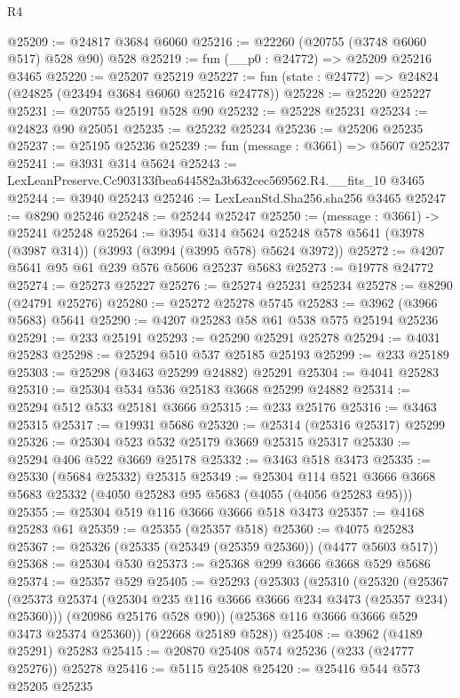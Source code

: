 \begin{lexlean}{R4}
\begin{coremodule}
@25209 := @24817 @3684 @6060
@25216 := @22260 (@20755 (@3748 @6060 @517) @528 @90) @528
@25219 := fun (__p0 : @24772) => @25209 @25216 @3465
@25220 := @25207 @25219
@25227 := fun (state : @24772) => @24824 (@24825 (@23494 @3684 @6060 @25216 @24778))
@25228 := @25220 @25227
@25231 := @20755 @25191 @528 @90
@25232 := @25228 @25231
@25234 := @24823 @90 @25051
@25235 := @25232 @25234
@25236 := @25206 @25235
@25237 := @25195 @25236
@25239 := fun (message : @3661) => @5607 @25237
@25241 := @3931 @314 @5624
@25243 := LexLeanPreserve.Cc903133fbea644582a3b632cec569562.R4.__fits_10 @3465
@25244 := @3940 @25243
@25246 := LexLeanStd.Sha256.sha256 @3465
@25247 := @8290 @25246
@25248 := @25244 @25247
@25250 := (message : @3661) -> @25241 @25248
@25264 := @3954
    @314
    @5624
    @25248
    @578
    @5641
    (@3978 (@3987 @314))
    (@3993 (@3994 (@3995 @578) @5624 @3972))
@25272 := @4207 @5641 @95 @61 @239 @576 @5606 @25237 @5683
@25273 := @19778 @24772
@25274 := @25273 @25227
@25276 := @25274 @25231 @25234
@25278 := @8290 (@24791 @25276)
@25280 := @25272 @25278 @5745
@25283 := @3962 (@3966 @5683) @5641
@25290 := @4207 @25283 @58 @61 @538 @575 @25194 @25236
@25291 := @233 @25191
@25293 := @25290 @25291 @25278
@25294 := @4031 @25283
@25298 := @25294 @510 @537 @25185 @25193
@25299 := @233 @25189
@25303 := @25298 (@3463 @25299 @24882) @25291
@25304 := @4041 @25283
@25310 := @25304 @534 @536 @25183 @3668 @25299 @24882
@25314 := @25294 @512 @533 @25181 @3666
@25315 := @233 @25176
@25316 := @3463 @25315
@25317 := @19931 @5686
@25320 := @25314 (@25316 @25317) @25299
@25326 := @25304 @523 @532 @25179 @3669 @25315 @25317
@25330 := @25294 @406 @522 @3669 @25178
@25332 := @3463 @518 @3473
@25335 := @25330 (@5684 @25332) @25315
@25349 := @25304
    @114
    @521
    @3666
    @3668
    @5683
    @25332
    (@4050 @25283 @95 @5683 (@4055 (@4056 @25283 @95)))
@25355 := @25304 @519 @116 @3666 @3666 @518 @3473
@25357 := @4168 @25283 @61
@25359 := @25355 (@25357 @518)
@25360 := @4075 @25283
@25367 := @25326 (@25335 (@25349 (@25359 @25360)) (@4477 @5603 @517))
@25368 := @25304 @530
@25373 := @25368 @299 @3666 @3668 @529 @5686
@25374 := @25357 @529
@25405 := @25293
    (@25303
      (@25310
        (@25320
          (@25367 (@25373 @25374 (@25304 @235 @116 @3666 @3666 @234 @3473 (@25357 @234) @25360)))
          (@20986 @25176 @528 @90))
        (@25368 @116 @3666 @3666 @529 @3473 @25374 @25360))
      (@22668 @25189 @528))
@25408 := @3962 (@4189 @25291) @25283
@25415 := @20870 @25408 @574 @25236 (@233 (@24777 @25276)) @25278
@25416 := @5115 @25408
@25420 := @25416 @544 @573 @25205 @25235

\end{coremodule}
\end{lexlean}
